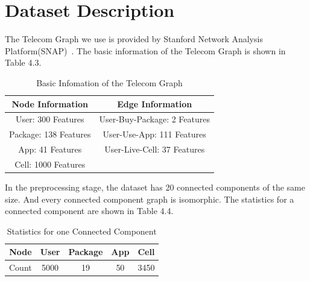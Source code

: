 \documentclass[ %
                    author={Tengyao Tu},
                supervisor={Dr. James Pope},
                    degree={MSc},
                     title={A New Perspective on Graph Community Detection: Combining Traditional Methods with Deep Learning Approaches},
                  subtitle={Applying to Telecom Networks and Diverse Datasets},
                      type={},
                      year={2024}]{dissertation}
\begin{document}
\section{Dataset Description}
The Telecom Graph we use is provided by Stanford Network Analysis Platform(SNAP)~\cite{snapnets}. The basic information of the Telecom Graph is shown in Table 4.3.
\begin{table}[!htbp] 
\centering 
\label{Basic Infomation} 
\caption{Basic Infomation of the Telecom Graph} 
\vspace{5pt} 
\begin{tabular}{cc} 
\hline 
Node Information &Edge Information \\ 
\hline
User: 300 Features &User-Buy-Package: 2 Features \\
Package: 138 Features &User-Use-App: 111 Features \\
App: 41 Features & User-Live-Cell: 37 Features \\
Cell: 1000 Features &\\
\hline
\end{tabular}
\end{table}
In the preprocessing stage, the dataset has 20 connected components of the same size. And every connected component graph is isomorphic. The statistics for a connected component are shown in Table 4.4.
\begin{table}[!htbp] 
\centering 
\label{Basic Infomation} 
\caption{Statistics for one Connected Component} 
\vspace{5pt} 
\begin{tabular}{ccccc} 
\hline 
Node &User&Package&App&Cell \\ 
\hline
Count&5000&19&50&3450\\
\hline
\end{tabular}
\end{table}
\end{document}
